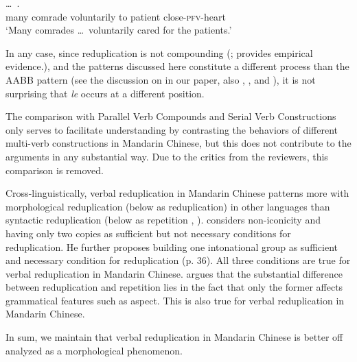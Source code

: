 \documentclass[fleqn,twoside]{article}
\begin{document}
\begin{enumerate}
\ea\label{ex:guanxin}%
\gll {}  \ldots\,    .\\
many comrade {} voluntarily to patient close-\textsc{pfv}-heart\\
\glt `Many comrades \ldots\, voluntarily cared for the patients.'
\z

In any case, since reduplication is not compounding (\citealt[149--150]{Sui2018}; \citealt{GaoEtAl2021} provides empirical evidence.),
and the patterns discussed here constitute a different process than the AABB pattern
(see the discussion on \citealt{Xie2020} in our paper, also \citealt[Sec. 4.3]{Deng2013}, \citealt[Sec. 2]{SuiHu2016}, \citealt{Sui2018} and \citealt{Wang2023}),
it is not surprising that \textit{le} occurs at a different position.

The comparison with Parallel Verb Compounds and Serial Verb Constructions only serves to facilitate understanding
by contrasting the behaviors of different multi-verb constructions in Mandarin Chinese,
but this does not contribute to the arguments in any substantial way.
Due to the critics from the reviewers, this comparison is removed.

Cross-linguistically, verbal reduplication in Mandarin Chinese patterns more with morphological reduplication (below as reduplication) in other languages
than syntactic reduplication (below as repetition \citealt[31]{Gil2005}, \citealt[1--2]{Forza2016}).
\citet[35--36]{Gil2005} considers non-iconicity and having only two copies as sufficient but not necessary conditions for reduplication.
He further proposes building one intonational group as sufficient and necessary condition for reduplication (p. 36).
All three conditions are true for verbal reduplication in Mandarin Chinese.
\citet[9]{Forza2016} argues that the substantial difference between reduplication and repetition lies in the fact that only the former affects grammatical features such as aspect.
This is also true for verbal reduplication in Mandarin Chinese.

In sum, we maintain that verbal reduplication in Mandarin Chinese is better off analyzed as a morphological phenomenon.


\end{enumerate}
\end{document}
